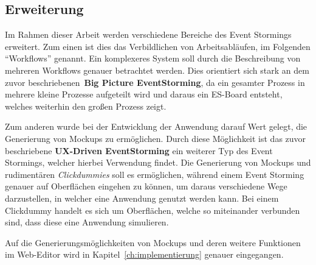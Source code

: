\subsection{Erweiterung}\label{subsec:erweiterung}
Im Rahmen dieser Arbeit werden verschiedene Bereiche des Event Stormings erweitert.
Zum einen ist dies das Verbildlichen von Arbeitsabläufen, im Folgenden ``Workflows'' genannt.
Ein komplexeres System soll durch die Beschreibung von mehreren Workflows genauer betrachtet werden.
Dies orientiert sich stark an dem zuvor beschriebenen~\textbf{Big Picture EventStorming}, da ein gesamter Prozess in mehrere kleine
Prozesse aufgeteilt wird und daraus ein \ac{ES}-Board entsteht, welches weiterhin den großen Prozess zeigt.

Zum anderen wurde bei der Entwicklung der Anwendung darauf Wert gelegt, die Generierung von Mockups zu ermöglichen.
Durch diese Möglichkeit ist das zuvor beschriebene \textbf{UX-Driven EventStorming} ein weiterer Typ des Event Stormings, welcher hierbei Verwendung findet.
Die Generierung von Mockups und rudimentären \textit{Clickdummies} soll es ermöglichen, während einem Event Storming genauer auf Oberflächen eingehen zu können,
um daraus verschiedene Wege darzustellen, in welcher eine Anwendung genutzt werden kann.
Bei einem Clickdummy handelt es sich um Oberflächen, welche so miteinander verbunden sind, dass diese eine Anwendung simulieren.

Auf die Generierungsmöglichkeiten von Mockups und deren weitere Funktionen im Web-Editor wird in Kapitel~\ref{ch:implementierung} genauer eingegangen.

